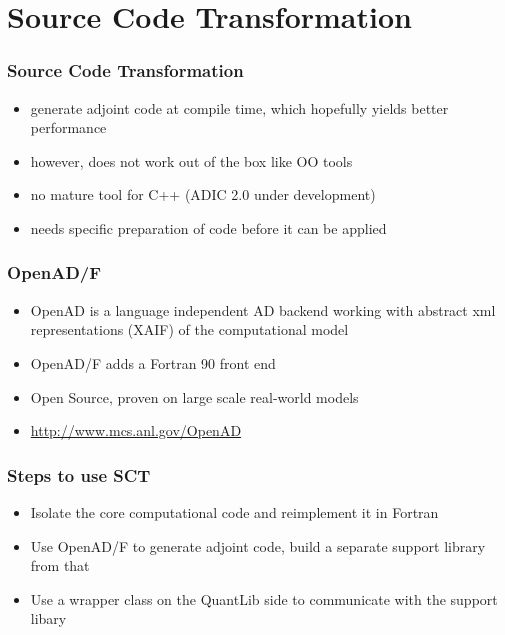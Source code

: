 \documentclass{beamer}
\begin{document}
\section{Source Code Transformation}

\begin{frame}[fragile]
\frametitle{Source Code Transformation}
\begin{itemize}
\item generate adjoint code at compile time, which hopefully yields better performance
\item however, does not work out of the box like OO tools
\item no mature tool for C++ (ADIC 2.0 under development)
\item needs specific preparation of code before it can be applied
\end{itemize}
\end{frame}

\begin{frame}[fragile]
\frametitle{OpenAD/F}
\begin{itemize}
\item OpenAD is a language independent AD backend working with abstract xml representations (XAIF) of the computational model
\item OpenAD/F adds a Fortran 90 front end
\item Open Source, proven on large scale real-world models
\item \url{http://www.mcs.anl.gov/OpenAD}
\end{itemize}
\end{frame}

\begin{frame}[fragile]
\frametitle{Steps to use SCT}
\begin{itemize}
\item Isolate the core computational code and reimplement it in Fortran
\item Use OpenAD/F to generate adjoint code, build a separate support library from that
\item Use a wrapper class on the QuantLib side to communicate with the support libary
\end{itemize}
\end{frame}
\end{document}

